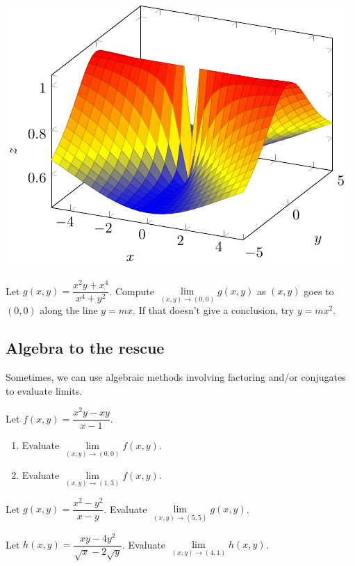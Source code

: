 \vfill

\mbox{} \hfill \includegraphics[scale=1]{tikz-pictures/section-10.1-pic1-hole-at-origin.pdf}\label{img:tikz-bad-limit}

\pagebreak 

\begin{ex}
    Let $g(x,y)=\dfrac{x^2y+x^4}{x^4+y^2}$. Compute $\lim\limits_{(x,y)\to(0,0)}g(x,y)$ as $(x,y)$ goes to $(0,0)$ along the line $y=mx$. If that doesn't give a conclusion, try $y=mx^2$.
\end{ex}

\vfill\vfill\vfill

\subsection{Algebra to the rescue}\label{subsec:algebraic-cancellation}
Sometimes, we can use algebraic methods involving factoring and/or conjugates to evaluate limits.
\begin{ex}
    Let $f(x,y)=\dfrac{x^2y-xy}{x-1}$.
    \begin{enumerate}
        \item Evaluate $\lim\limits_{(x,y)\to(0,0)} f(x,y)$.
        \vfill
        \item Evaluate $\lim\limits_{(x,y)\to(1,3)} f(x,y)$.
        \vfill
    \end{enumerate}
\end{ex}

\pagebreak 

\begin{ex}
    Let $g(x,y)=\dfrac{x^2-y^2}{x-y}$. Evaluate $\lim\limits_{(x,y)\to(5,5)}g(x,y)$.
\end{ex}

\vfill

\begin{ex}
    Let $h(x,y)=\dfrac{xy-4y^2}{\sqrt{x}-2\sqrt{y}}$. Evaluate $\lim\limits_{(x,y)\to(4,1)}h(x,y)$.
\end{ex}

\vfill

\pagebreak 

